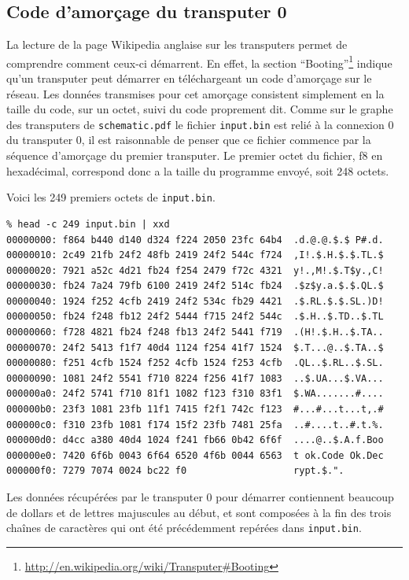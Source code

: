 \documentclass[a4paper,10pt]{article}
\begin{document}
\subsection{Code d'amorçage du transputer 0}

La lecture de la page Wikipedia anglaise sur les transputers permet de comprendre comment ceux-ci démarrent.
En effet, la section ``Booting''\footnote{\url{http://en.wikipedia.org/wiki/Transputer\#Booting}} indique qu'un transputer peut démarrer en téléchargeant un code d'amorçage sur le réseau.
Les données transmises pour cet amorçage consistent simplement en la taille du code, sur un octet, suivi du code proprement dit.
Comme sur le graphe des transputers de \texttt{schematic.pdf} le fichier \texttt{input.bin} est relié à la connexion 0 du transputer 0, il est raisonnable de penser que ce fichier commence par la séquence d'amorçage du premier transputer.
Le premier octet du fichier, f8 en hexadécimal, correspond donc a la taille du programme envoyé, soit 248 octets.

Voici les 249 premiers octets de \texttt{input.bin}.
\begin{verbatim}
% head -c 249 input.bin | xxd
00000000: f864 b440 d140 d324 f224 2050 23fc 64b4  .d.@.@.$.$ P#.d.
00000010: 2c49 21fb 24f2 48fb 2419 24f2 544c f724  ,I!.$.H.$.$.TL.$
00000020: 7921 a52c 4d21 fb24 f254 2479 f72c 4321  y!.,M!.$.T$y.,C!
00000030: fb24 7a24 79fb 6100 2419 24f2 514c fb24  .$z$y.a.$.$.QL.$
00000040: 1924 f252 4cfb 2419 24f2 534c fb29 4421  .$.RL.$.$.SL.)D!
00000050: fb24 f248 fb12 24f2 5444 f715 24f2 544c  .$.H..$.TD..$.TL
00000060: f728 4821 fb24 f248 fb13 24f2 5441 f719  .(H!.$.H..$.TA..
00000070: 24f2 5413 f1f7 40d4 1124 f254 41f7 1524  $.T...@..$.TA..$
00000080: f251 4cfb 1524 f252 4cfb 1524 f253 4cfb  .QL..$.RL..$.SL.
00000090: 1081 24f2 5541 f710 8224 f256 41f7 1083  ..$.UA...$.VA...
000000a0: 24f2 5741 f710 81f1 1082 f123 f310 83f1  $.WA.......#....
000000b0: 23f3 1081 23fb 11f1 7415 f2f1 742c f123  #...#...t...t,.#
000000c0: f310 23fb 1081 f174 15f2 23fb 7481 25fa  ..#....t..#.t.%.
000000d0: d4cc a380 40d4 1024 f241 fb66 0b42 6f6f  ....@..$.A.f.Boo
000000e0: 7420 6f6b 0043 6f64 6520 4f6b 0044 6563  t ok.Code Ok.Dec
000000f0: 7279 7074 0024 bc22 f0                   rypt.$.".
\end{verbatim}

Les données récupérées par le transputer 0 pour démarrer contiennent beaucoup de dollars et de lettres majuscules au début, et sont composées à la fin des trois chaînes de caractères qui ont été précédemment repérées dans \texttt{input.bin}.
\end{document}
